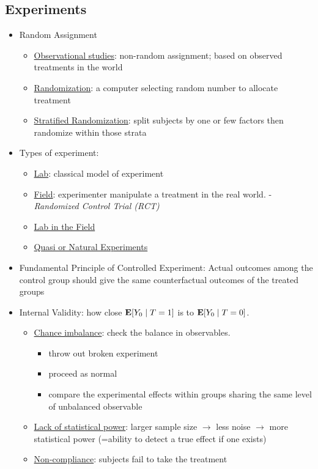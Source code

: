 \documentclass[10pt, letterpaper]{article}
\def\E{\vb E}
\begin{document}
\begin{multicols}{2}
\section*{Experiments}
\begin{itemize}
	\item Random Assignment
	\begin{itemize}
		\item \underline{Observational studies}: non-random assignment; based on observed treatments in the world
		\item \underline{Randomization}: a computer selecting random number to allocate treatment
		\item \underline{Stratified Randomization}: split subjects by one or few factors then randomize within those strata
	\end{itemize}
	\item Types of experiment:
	\begin{itemize}
		\item \underline{Lab}: classical model of experiment
		\item \underline{Field}: experimenter manipulate a treatment in the real world. -\textit{Randomized Control Trial (RCT)}
		\item \underline{Lab in the Field}
		\item \underline{Quasi or Natural Experiments}
	\end{itemize}
	\item Fundamental Principle of Controlled Experiment: Actual outcomes among the control group should give the same counterfactual outcomes of the treated groups
	\item Internal Validity: how close $\E[Y_0\mid T=1]$ is to $\E[Y_0\mid T=0]$.
	\begin{itemize}
		\item \underline{Chance imbalance}: check the balance in observables. 
		\begin{itemize}
			\item throw out broken experiment
			\item proceed as normal
			\item compare the experimental effects within groups sharing the same level of unbalanced observable
		\end{itemize}
		\item \underline{Lack of statistical power}: larger sample size $\rightarrow$ less noise $\rightarrow$ more statistical power (=ability to detect a true effect if one exists)
		\item \underline{Non-compliance}: subjects fail to take the treatment

\end{itemize}
\end{itemize}
\end{multicols}
\end{document}
